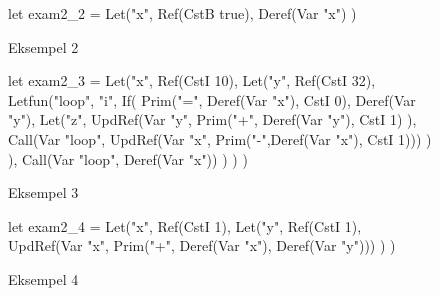 \begin{figure}[!ht]
    \begin{FSharp}
let exam2_2 = 
  Let("x", Ref(CstB true),
    Deref(Var "x")
  )
    \end{FSharp}
    \caption{Eksempel 2}\label{fig:2016:udtryk2}
\end{figure}
\begin{figure}[!ht]
    \begin{FSharp}
let exam2_3 = 
  Let("x", Ref(CstI 10),
    Let("y", Ref(CstI 32),
      Letfun("loop", "i",
        If(
          Prim("=", Deref(Var "x"), CstI 0),
          Deref(Var "y"),
          Let("z", 
            UpdRef(Var "y", 
              Prim("+",
                Deref(Var "y"), 
                CstI 1)
            ),
            Call(Var "loop", UpdRef(Var "x", Prim("-",Deref(Var "x"), CstI 1)))
          )
        ),
        Call(Var "loop", Deref(Var "x"))
      )
    )
  )
    \end{FSharp}
    \caption{Eksempel 3}\label{fig:2016:udtryk3}
\end{figure}
\begin{figure}[!ht]
    \begin{FSharp}
let exam2_4 = 
  Let("x", Ref(CstI 1),
    Let("y", Ref(CstI 1),
      UpdRef(Var "x", Prim("+", Deref(Var "x"), Deref(Var "y")))
    )
  )
    \end{FSharp}
    \caption{Eksempel 4}\label{fig:2016:udtryk4}
\end{figure}
